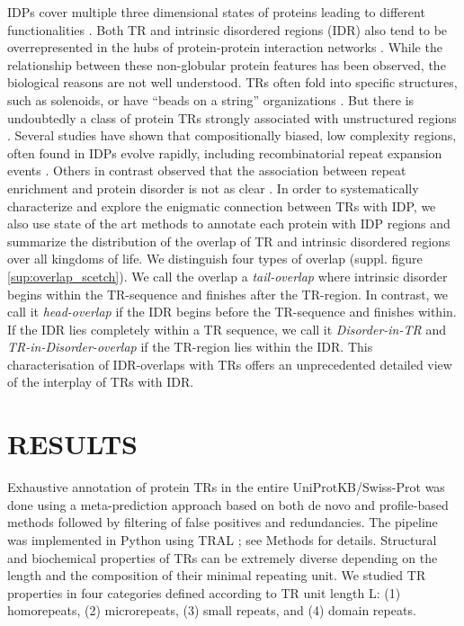 \documentclass[a4,center,fleqn]{NAR}
\begin{document}
IDPs cover multiple three dimensional states of proteins leading to different functionalities \cite{Dunker2001}. 
Both TR and intrinsic disordered regions (IDR) also tend to be overrepresented in the hubs of protein-protein interaction networks \cite{Ekman2006}. While the relationship between these non-globular protein features has been observed, the biological reasons are not well understood. 
TRs often fold into specific structures, such as solenoids, or have “beads on a string” organizations \cite{Kajava2012}. But there is undoubtedly a class of protein TRs strongly associated with unstructured regions \cite{Jorda2010, Szalkowski2013}. Several studies have shown that compositionally biased, low complexity regions, often found in IDPs evolve rapidly, including recombinatorial repeat expansion events \cite{Tompa2003, Simon2009}. Others in contrast observed that the association between repeat enrichment and protein disorder is not as clear \cite{Light2013}.
In order to systematically characterize and explore the enigmatic connection between TRs with IDP, we also use state of the art methods to annotate each protein with IDP regions and summarize the distribution of the overlap of TR and intrinsic disordered regions over all kingdoms of life. We distinguish four types of overlap (suppl. figure \ref{sup:overlap_scetch}). We call the overlap a \textit{tail-overlap} where intrinsic disorder begins within the TR-sequence and finishes after the TR-region. In contrast, we call it \textit{head-overlap} if the IDR begins before the TR-sequence and finishes within. If the IDR lies completely within a TR sequence, we call it \textit{Disorder-in-TR} and \textit{TR-in-Disorder-overlap} if the TR-region lies within the IDR. This characterisation of IDR-overlaps with TRs offers an unprecedented detailed view of the interplay of TRs with IDR. 

\section{RESULTS}
Exhaustive annotation of protein TRs in the entire UniProtKB/Swiss-Prot was done using a meta-prediction approach based on both de novo and profile-based methods followed by filtering of false positives and redundancies. The pipeline was implemented in Python using TRAL \citep{Schaper2015}; see Methods for details. Structural and biochemical properties of TRs can be extremely diverse depending on the length and the composition of their minimal repeating unit. We studied TR properties in four categories defined according to TR unit length L:
(1) homorepeats, (2) microrepeats, (3) small repeats, and (4) domain repeats. 
\end{document}
